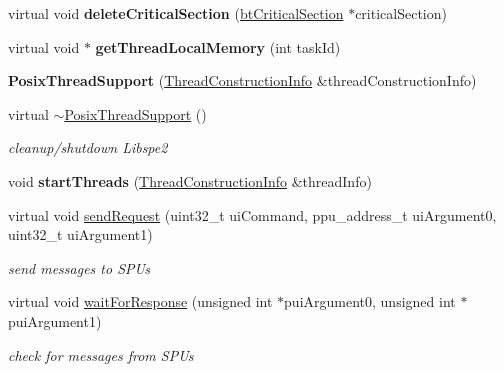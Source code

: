 \begin{DoxyCompactItemize}
virtual void {\bfseries delete\+Critical\+Section} (\hyperlink{classbtCriticalSection}{bt\+Critical\+Section} $\ast$critical\+Section)
\item 
\mbox{\label{classPosixThreadSupport_a0c1bbe94d966d082f8b5a3ea616ddf35}} 
virtual void $\ast$ {\bfseries get\+Thread\+Local\+Memory} (int task\+Id)
\item 
\mbox{\label{classPosixThreadSupport_a6b82e5cd33a67247d6ce7dd2c9c1be17}} 
{\bfseries Posix\+Thread\+Support} (\hyperlink{structPosixThreadSupport_1_1ThreadConstructionInfo}{Thread\+Construction\+Info} \&thread\+Construction\+Info)
\item 
\mbox{\label{classPosixThreadSupport_a98290045e507e8d60b2f8e255a0fe1b6}} 
virtual \hyperlink{classPosixThreadSupport_a98290045e507e8d60b2f8e255a0fe1b6}{$\sim$\+Posix\+Thread\+Support} ()
\begin{DoxyCompactList}\small\item\em cleanup/shutdown Libspe2 \end{DoxyCompactList}\item 
\mbox{\label{classPosixThreadSupport_a4afd23caaba58363c15c578157d364ba}} 
void {\bfseries start\+Threads} (\hyperlink{structPosixThreadSupport_1_1ThreadConstructionInfo}{Thread\+Construction\+Info} \&thread\+Info)
\item 
\mbox{\label{classPosixThreadSupport_a25512e56f0d812cb99040c9d395e5fc4}} 
virtual void \hyperlink{classPosixThreadSupport_a25512e56f0d812cb99040c9d395e5fc4}{send\+Request} (uint32\+\_\+t ui\+Command, ppu\+\_\+address\+\_\+t ui\+Argument0, uint32\+\_\+t ui\+Argument1)
\begin{DoxyCompactList}\small\item\em send messages to S\+P\+Us \end{DoxyCompactList}\item 
\mbox{\label{classPosixThreadSupport_addc01382ac1979a87db891c203123ec3}} 
virtual void \hyperlink{classPosixThreadSupport_addc01382ac1979a87db891c203123ec3}{wait\+For\+Response} (unsigned int $\ast$pui\+Argument0, unsigned int $\ast$pui\+Argument1)
\begin{DoxyCompactList}\small\item\em check for messages from S\+P\+Us \end{DoxyCompactList}\item 

\end{DoxyCompactItemize}
